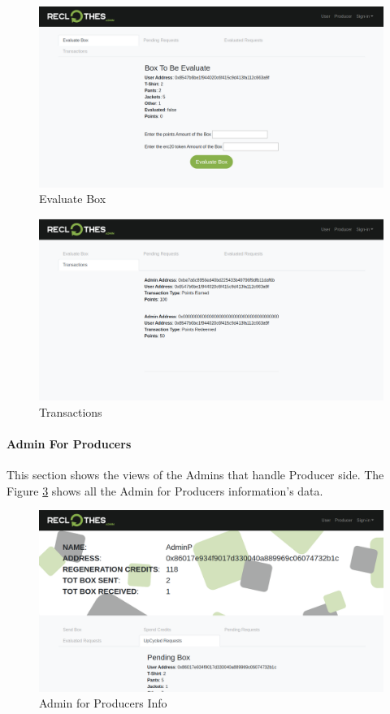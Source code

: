 \begin{figure}[h!]
    \centering
    \includegraphics[totalheight=7.5cm]{img/dapp/admin-evaluate.png}
    \caption{Evaluate Box}
    \label{fig:evaluate_box}
\end{figure}

\begin{figure}[h!]
    \centering
    \includegraphics[totalheight=7.5cm]{img/dapp/admin-tx.png}
    \caption{Transactions}
    \label{fig:admin-tx}
\end{figure}

\paragraph{Admin For Producers}

This section shows the views of the Admins that handle Producer side. The Figure \ref{fig:adminp-info} 
shows all the Admin for Producers information's data. 

\begin{figure}[h!]
    \centering
    \includegraphics[totalheight=7.5cm]{img/dapp/adminp-info.png}
    \caption{Admin for Producers Info}
    \label{fig:adminp-info}
\end{figure}

